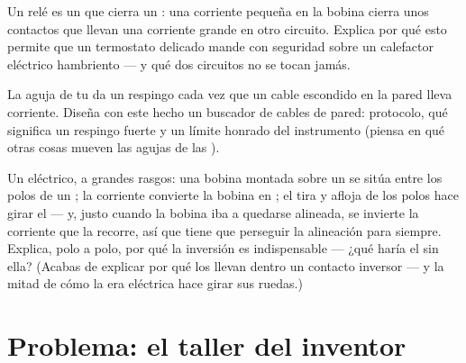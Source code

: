 \begin{exercise}[$\star\star$]\label{exo:g8:electric-current-effects:10}
Un relé es un  que cierra un : una
corriente pequeña en la bobina cierra unos contactos que llevan una
corriente grande en otro circuito. Explica por qué esto permite que un
termostato delicado mande con seguridad sobre un calefactor eléctrico
hambriento --- y qué dos circuitos no se tocan jamás.
\end{exercise}

\begin{exercise}[$\star\star$]\label{exo:g8:electric-current-effects:11}
La aguja de tu  da un respingo cada vez que un cable
escondido en la pared lleva corriente. Diseña con este hecho un
buscador de cables de pared: protocolo, qué significa un respingo
fuerte y un límite honrado del instrumento (piensa en qué otras cosas
mueven las agujas de las ).
\end{exercise}

\begin{exercise}[$\star\star\star$]\label{exo:g8:electric-current-effects:12}
Un  eléctrico, a grandes rasgos: una bobina montada sobre un
 se sitúa entre los polos de un ; la corriente convierte la
bobina en ; el tira y afloja de los polos hace girar el  ---
y, justo cuando la bobina iba a quedarse alineada, se invierte la
corriente que la recorre, así que tiene que perseguir la alineación
para siempre. Explica, polo a polo, por qué la inversión es
indispensable --- ¿qué haría el  sin ella? (Acabas de explicar
por qué los  llevan dentro un contacto inversor --- y la
mitad de cómo la era eléctrica hace girar sus ruedas.)
\end{exercise}

\section{Problema: el taller del inventor}

